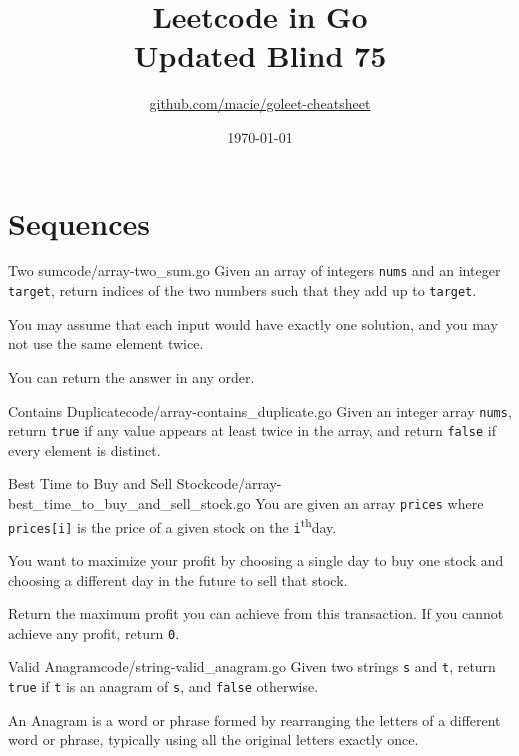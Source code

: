 \documentclass[10pt]{report}
\title{Leetcode in Go\\\large{Updated Blind 75}}
\author{\href{https://github.com/macie/goleet-cheatsheet}{github.com/macie/goleet-cheatsheet}}
\date{\today}
\newcommand{\nth}[0]{\textsuperscript{th}\space}
\newcommand{\var}[1]{\texttt{#1}}
\newcommand\blankpage{%
    \clearpage
    \null
    \thispagestyle{empty}%
    \clearpage
}
\begin{document}
\maketitle
\blankpage
\addtocounter{page}{-1}%

\part{Sequences}
\blankpage

\begin{problem}{Two sum}{code/array-two_sum.go}
Given an array of integers \var{nums} and an integer \var{target}, return indices of the two numbers such that they add up to \var{target}.

You may assume that each input would have exactly one solution, and you may not use the same element twice.

You can return the answer in any order.
\end{problem}

\begin{problem}{Contains Duplicate}{code/array-contains_duplicate.go}
Given an integer array \var{nums}, return \var{true} if any value appears at least twice in the array, and return \var{false} if every element is distinct.
\end{problem}

\begin{problem}{Best Time to Buy and Sell Stock}{code/array-best_time_to_buy_and_sell_stock.go}
You are given an array \var{prices} where \var{prices[i]} is the price of a given stock on the \var{i}\nth day.

You want to maximize your profit by choosing a single day to buy one stock and choosing a different day in the future to sell that stock.

Return the maximum profit you can achieve from this transaction. If you cannot achieve any profit, return \var{0}.
\end{problem}

\begin{problem}{Valid Anagram}{code/string-valid_anagram.go}
Given two strings \var{s} and \var{t}, return \var{true} if \var{t} is an anagram of \var{s}, and \var{false} otherwise.

An Anagram is a word or phrase formed by rearranging the letters of a different word or phrase, typically using all the original letters exactly once.
\end{problem}
\end{document}
